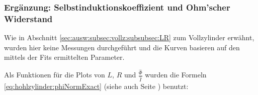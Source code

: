 {\begin{minipage}[t]{0.33\textwidth}
        \subsubsection{Erg\"anzung: Selbstinduktionskoeffizient und Ohm'scher Widerstand}
        \label{sec:ausw:subsec:hohlz:st:subsubsec:LR}

        Wie   in    Abschnitt   \ref{sec:ausw:subsec:vollz:subsubsec:LR}   zum
        Vollzylinder erw\"ahnt, wurden hier keine Messungen durchgef\"uhrt und
        die Kurven basieren auf den mittels der Fits ermittelten Parameter.

        Als     Funktionen     f\"ur     die    Plots     von     $L$,     $R$
        und      $\frac{\hat{\Phi}}{\hat{I}}$      wurden     die      Formeln
        \ref{eq:hohlzylinder:phiNormExact}       (siehe       auch       Seite
        \pageref{eq:hohlzylinder:phiNormExact}) benutzt:

        \vspace{1em}

        \begin{minipage}[c][][b]{0.5\textwidth}
            \vspace{0pt}
            
        \end{minipage}%
        \begin{minipage}[c][][b]{0.5\textwidth}
            \vspace{0pt}
            
        \end{minipage}
	\end{minipage}%
	\begin{minipage}[t]{0.67\textwidth}
        \vspace{0pt}
        \resizebox{.95\textwidth}{!}{}
        \label{fig:st:freq:L}
        \resizebox{.95\textwidth}{!}{}
        \label{fig:st:freq:R}
	\end{minipage}

	\begin{minipage}[t]{0.33\textwidth}
        \vspace{0pt}
        
	\end{minipage}%
	\begin{minipage}[t]{0.67\textwidth}
        \vspace{0pt}
        \resizebox{.95\textwidth}{!}{}
        \label{fig:cu:freq:phi}
	\end{minipage}

}
